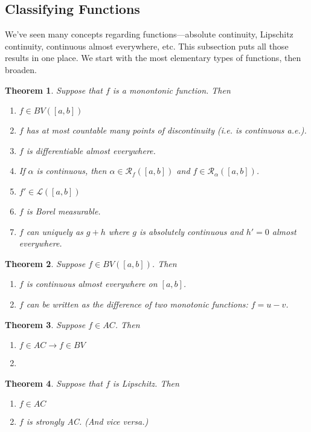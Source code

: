 \documentclass[12pt]{article}
\theoremstyle{plain}
\newtheorem{thm}{Theorem}[subsection]
\theoremstyle{definition}
\theoremstyle{remark}
\begin{document}
\subsection{Classifying Functions}

We've seen many concepts regarding functions---absolute continuity, Lipschitz continuity, continuous almost everywhere, etc. This subsection puts all those results in one place. We start with the most elementary types of functions, then broaden.

\begin{thm}
Suppose that $f$ is a monontonic function. Then
\begin{enumerate}
    \item $f\in BV([a,b])$
    \item $f$ has at most countable many points of discontinuity (i.e. is continuous a.e.).
    \item $f$ is differentiable almost everywhere.
    \item If $\alpha$ is continuous, then $\alpha \in \mathscr{R}_f([a,b])$ and $f\in\mathscr{R}_\alpha([a,b])$.
    \item $f'\in\mathscr{L}([a,b])$ 
    \item $f$ is Borel measurable.
    \item $f$ can uniquely as $g+h$ where $g$ is absolutely continuous and $h'=0$ almost everywhere.
\end{enumerate}
\end{thm}

\begin{thm}
Suppose $f\in BV([a,b])$. Then
\begin{enumerate}
\item $f$ is continuous almost everywhere on $[a,b]$.
\item $f$ can be written as the difference of two monotonic functions: $f=u-v$.
\end{enumerate}
\end{thm}

\begin{thm} Suppose $f\in AC$. Then
\begin{enumerate}
\item $f\in AC\rightarrow f\in BV$
\item 
\end{enumerate}
\end{thm}

\begin{thm}
Suppose that $f$ is Lipschitz. Then
\begin{enumerate}
\item $f\in AC$
\item $f$ is \emph{strongly} AC. (And vice versa.)
\end{enumerate}
\end{thm}
\end{document}
